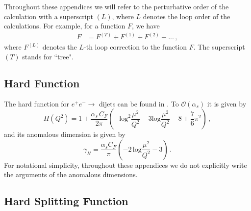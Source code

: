 \documentclass[a4paper,11pt]{article}
\def\log{\text{log}}
\begin{document}
Throughout these appendices we will refer to the perturbative order of the calculation with a superscript $(L)$, where $L$ denotes the loop order of the calculations. For example, for a function $F$, we have
\begin{align}
F&=F^{(T)}+F^{(1)}+F^{(2)}+...\,,
\end{align}
where $F^{(L)}$ denotes the $L$-th loop correction to the function $F$. The superscript $(T)$ stands for ``tree".



\subsection{Hard Function}

The hard function for $e^+e^-\to$ dijets can be found in \cite{Bauer:2003di,Manohar:2003vb,Ellis:2010rwa,Bauer:2011uc}. To $\mathcal{O}(\alpha_s)$ it is given by
\begin{equation}
    H(Q^2) = 1 + \frac{\alpha_s\,C_F}{2\pi} \left(-\log^2 \frac{\mu^2}{Q^2} - 3\log \frac{\mu^2}{Q^2} - 8+\frac{7}{6}\pi^2\right)\,,
\end{equation}
and its anomalous dimension is given by
\begin{equation}
\gamma_H = \frac{\alpha_sC_F}{\pi}\left(
-2\,\log\frac{\mu^2}{Q^2}-3
\right)\,.
\end{equation}
For notational simplicity, throughout these appendices we do not explicitly write the arguments of the anomalous dimensions.

\subsection{Hard Splitting Function}
\end{document}
